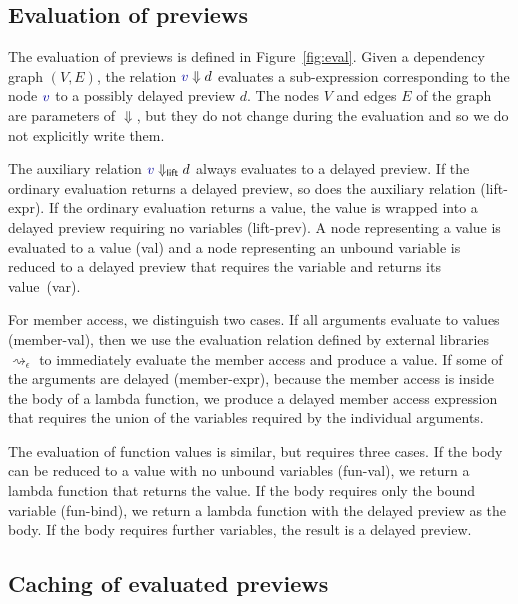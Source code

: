 \documentclass[english,crc]{programming}
\theoremstyle{plain}
\theoremstyle{definition}
\newcommand{\ident}[1]{\textnormal{\textcolor{idclr}{\sffamily #1}}}
\newcommand{\bndclr}[1]{\textcolor{kvdclr}{#1}}
\newcommand{\rname}[1]{{\sffamily(#1)}}
\begin{document}

\subsection{Evaluation of previews}
The evaluation of previews is defined in Figure~\ref{fig:eval}. Given a dependency graph $(V, E)$,
the relation $\bndclr{v}\Downarrow d$ evaluates a sub-expression corresponding to
the node $\bndclr{v}$ to a possibly delayed preview $d$. The nodes $V$ and edges $E$ of the
graph are parameters of $\Downarrow$, but they do not change during the
evaluation and so we do not explicitly write them.

The auxiliary relation $\bndclr{v}\Downarrow_{\ident{lift}} d$ always evaluates
to a delayed preview. If the ordinary evaluation returns a delayed preview, so does the auxiliary
relation \rname{lift-expr}. If the ordinary evaluation returns a value, the value is wrapped
into a delayed preview requiring no variables \rname{lift-prev}.
%
A node representing a value is evaluated to a value \rname{val} and a node representing
an unbound variable is reduced to a delayed preview that requires the variable and returns its
value~\rname{var}.

For member access, we distinguish two cases. If all arguments evaluate to values \rname{member-val},
then we use the evaluation relation defined by external libraries $\rightsquigarrow_\epsilon$ to
immediately evaluate the member access and produce a value. If some of the arguments are
delayed \rname{member-expr}, because the member access is inside the body of a lambda function,
we produce a delayed member access expression that requires the union of the variables
required by the individual arguments.

The evaluation of function values is similar, but requires three cases. If the body can
be reduced to a value with no unbound variables \rname{fun-val}, we return a lambda function that
returns the value. If the body requires only the bound variable \rname{fun-bind}, we return a
lambda function with the delayed preview as the body. If the body requires further variables,
the result is a delayed preview.

\subsection{Caching of evaluated previews}
\label{sec:previews-cache}
\end{document}
